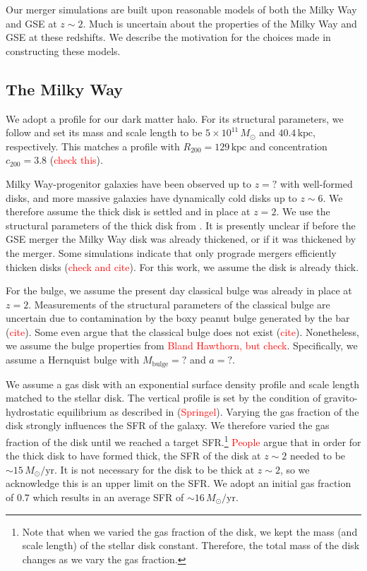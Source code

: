 \documentclass[linenumbers, twocolumn]{aastex631}
\newcommand{\Msun}{\ensuremath{M_{\odot}}}
\newcommand{\yr}{\ensuremath{\textrm{yr}}}
\newcommand{\kpc}{\ensuremath{\textrm{kpc}}}
\begin{document}
Our merger simulations are built upon reasonable models of both the Milky Way
and GSE at $z\sim2$. Much is uncertain about the properties of the Milky Way and
GSE at these redshifts.  We describe the motivation for the choices made in
constructing these models.

\subsection{The Milky Way}
We adopt a \citet{1990ApJ...356..359H} profile for our dark matter halo. For its
structural parameters, we follow \citet{2021ApJ...923...92N} and set its mass
and scale length to be $5\times10^{11}\,\Msun$ and $40.4\,\kpc$, respectively.
This matches a \citet{1996ApJ...462..563N} profile with
$R_{200}=129\,\textrm{kpc}$ and concentration $c_{200}=3.8$
(\textcolor{red}{check this}).

Milky Way-progenitor galaxies have been observed up to $z=?$ with well-formed
disks, and more massive galaxies have dynamically cold disks up to $z\sim6$. We
therefore assume the thick disk is settled and in place at $z=2$. We use the
structural parameters of the thick disk from . It is presently unclear if before
the GSE merger the Milky Way disk was already thickened, or if it was thickened
by the merger. Some simulations indicate that only prograde mergers efficiently
thicken disks (\textcolor{red}{check and cite}). For this work, we assume the
disk is already thick.

For the bulge, we assume the present day classical bulge was already in place at
$z=2$. Measurements of the structural parameters of the classical bulge are
uncertain due to contamination by the boxy peanut bulge generated by the bar
(\textcolor{red}{cite}). Some even argue that the classical bulge does not exist
(\textcolor{red}{cite}). Nonetheless, we assume the bulge properties from
\textcolor{red}{Bland Hawthorn, but check}. Specifically, we assume a Hernquist
bulge with $M_{\textrm{bulge}}=?$ and $a=?$.

We assume a gas disk with an exponential surface density profile and scale
length matched to the stellar disk. The vertical profile is set by the condition
of gravito-hydrostatic equilibrium as described in (\textcolor{red}{Springel}).
Varying the gas fraction of the disk strongly influences the SFR of the galaxy.
We therefore varied the gas fraction of the disk until we reached a target
SFR.\footnote{Note that when we varied the gas fraction of the disk, we kept the
mass (and scale length) of the stellar disk constant. Therefore, the total mass
of the disk changes as we vary the gas fraction.} \textcolor{red}{People} argue
that in order for the thick disk to have formed thick, the SFR of the disk at
$z\sim2$ needed to be $\sim15\,\Msun/\yr$. It is not necessary for the disk to
be thick at $z\sim2$, so we acknowledge this is an upper limit on the SFR. We
adopt an initial gas fraction of $0.7$ which results in an average SFR of
$\sim16\,\Msun/\yr$.
\end{document}
